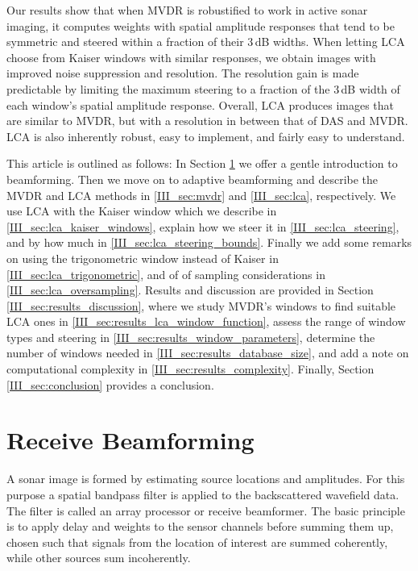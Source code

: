 Our results show that when MVDR is robustified to work in active sonar imaging, it computes weights with spatial amplitude responses that tend to be symmetric and steered within a fraction of their \minus{}3\,dB widths. When letting LCA choose from Kaiser windows with similar responses, we obtain images with improved noise suppression and resolution. The resolution gain is made predictable by limiting the maximum steering to a fraction of the \minus{}3\,dB width of each window's spatial amplitude response. Overall, LCA produces images that are similar to MVDR, but with a resolution in between that of DAS and MVDR. LCA is also inherently robust, easy to implement, and fairly easy to understand.

This article is outlined as follows: In Section \ref{III_sec:beamforming} we offer a gentle introduction to beamforming. Then we move on to adaptive beamforming and describe the MVDR and LCA methods in \ref{III_sec:mvdr} and \ref{III_sec:lca}, respectively. We use LCA with the Kaiser window which we describe in \ref{III_sec:lca_kaiser_windows}, explain how we steer it in \ref{III_sec:lca_steering}, and by how much in \ref{III_sec:lca_steering_bounds}. Finally we add some remarks on using the trigonometric window instead of Kaiser in \ref{III_sec:lca_trigonometric}, and of of sampling considerations in \ref{III_sec:lca_oversampling}. Results and discussion are provided in Section \ref{III_sec:results_discussion}, where we study MVDR's windows to find suitable LCA ones in \ref{III_sec:results_lca_window_function}, assess the range of window types and steering in \ref{III_sec:results_window_parameters}, determine the number of windows needed in \ref{III_sec:results_database_size}, and add a note on computational complexity in \ref{III_sec:results_complexity}. Finally, Section \ref{III_sec:conclusion} provides a conclusion.
 

\section{Receive Beamforming}\label{III_sec:beamforming}

A sonar image is formed by estimating source locations and amplitudes. For this purpose a spatial bandpass filter is applied to the backscattered wavefield data. The filter is called an array processor or receive beamformer. The basic principle is to apply delay and weights to the sensor channels before summing them up, chosen such that signals from the location of interest are summed coherently, while other sources sum incoherently.

